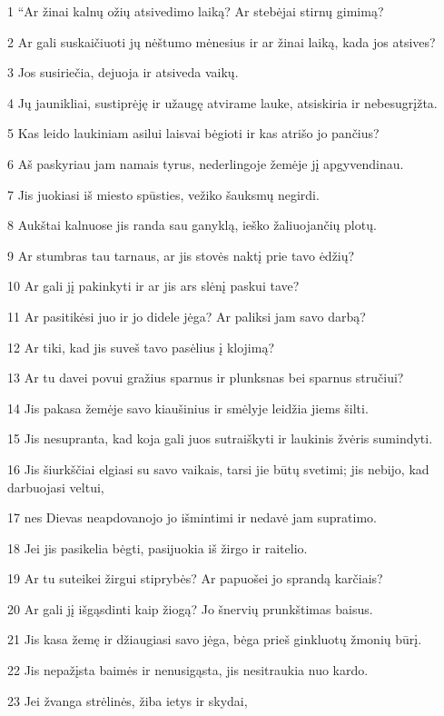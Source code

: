 \par 1 “Ar žinai kalnų ožių atsivedimo laiką? Ar stebėjai stirnų gimimą? 
\par 2 Ar gali suskaičiuoti jų nėštumo mėnesius ir ar žinai laiką, kada jos atsives? 
\par 3 Jos susiriečia, dejuoja ir atsiveda vaikų. 
\par 4 Jų jaunikliai, sustiprėję ir užaugę atvirame lauke, atsiskiria ir nebesugrįžta. 
\par 5 Kas leido laukiniam asilui laisvai bėgioti ir kas atrišo jo pančius? 
\par 6 Aš paskyriau jam namais tyrus, nederlingoje žemėje jį apgyvendinau. 
\par 7 Jis juokiasi iš miesto spūsties, vežiko šauksmų negirdi. 
\par 8 Aukštai kalnuose jis randa sau ganyklą, ieško žaliuojančių plotų. 
\par 9 Ar stumbras tau tarnaus, ar jis stovės naktį prie tavo ėdžių? 
\par 10 Ar gali jį pakinkyti ir ar jis ars slėnį paskui tave? 
\par 11 Ar pasitikėsi juo ir jo didele jėga? Ar paliksi jam savo darbą? 
\par 12 Ar tiki, kad jis suveš tavo pasėlius į klojimą? 
\par 13 Ar tu davei povui gražius sparnus ir plunksnas bei sparnus stručiui? 
\par 14 Jis pakasa žemėje savo kiaušinius ir smėlyje leidžia jiems šilti. 
\par 15 Jis nesupranta, kad koja gali juos sutraiškyti ir laukinis žvėris sumindyti. 
\par 16 Jis šiurkščiai elgiasi su savo vaikais, tarsi jie būtų svetimi; jis nebijo, kad darbuojasi veltui, 
\par 17 nes Dievas neapdovanojo jo išmintimi ir nedavė jam supratimo. 
\par 18 Jei jis pasikelia bėgti, pasijuokia iš žirgo ir raitelio. 
\par 19 Ar tu suteikei žirgui stiprybės? Ar papuošei jo sprandą karčiais? 
\par 20 Ar gali jį išgąsdinti kaip žiogą? Jo šnervių prunkštimas baisus. 
\par 21 Jis kasa žemę ir džiaugiasi savo jėga, bėga prieš ginkluotų žmonių būrį. 
\par 22 Jis nepažįsta baimės ir nenusigąsta, jis nesitraukia nuo kardo. 
\par 23 Jei žvanga strėlinės, žiba ietys ir skydai, 
